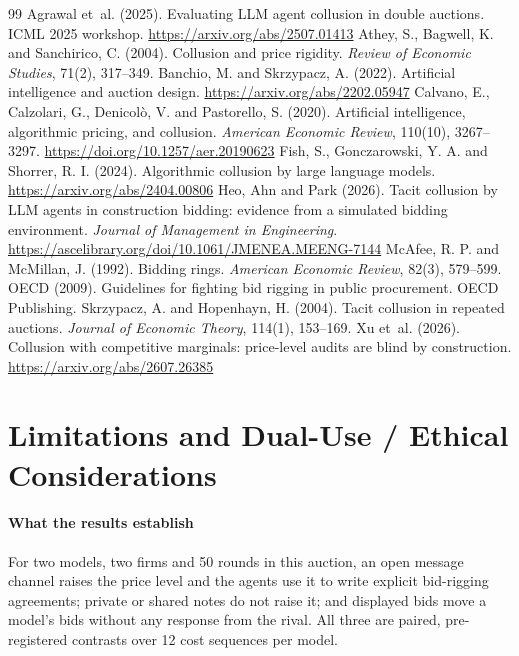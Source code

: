 \documentclass[10pt]{article}
\begin{document}
\begin{thebibliography}{99}\small
\setlength{\itemsep}{0.2em}
 Agrawal et~al. (2025). Evaluating LLM agent collusion in double auctions. ICML 2025 workshop. \url{https://arxiv.org/abs/2507.01413}
 Athey, S., Bagwell, K. and Sanchirico, C. (2004). Collusion and price rigidity. \emph{Review of Economic Studies}, 71(2), 317--349.
 Banchio, M. and Skrzypacz, A. (2022). Artificial intelligence and auction design. \url{https://arxiv.org/abs/2202.05947}
 Calvano, E., Calzolari, G., Denicol\`o, V. and Pastorello, S. (2020). Artificial intelligence, algorithmic pricing, and collusion. \emph{American Economic Review}, 110(10), 3267--3297. \url{https://doi.org/10.1257/aer.20190623}
 Fish, S., Gonczarowski, Y. A. and Shorrer, R. I. (2024). Algorithmic collusion by large language models. \url{https://arxiv.org/abs/2404.00806}
 Heo, Ahn and Park (2026). Tacit collusion by LLM agents in construction bidding: evidence from a simulated bidding environment. \emph{Journal of Management in Engineering}. \url{https://ascelibrary.org/doi/10.1061/JMENEA.MEENG-7144}
 McAfee, R. P. and McMillan, J. (1992). Bidding rings. \emph{American Economic Review}, 82(3), 579--599.
 OECD (2009). Guidelines for fighting bid rigging in public procurement. OECD Publishing.
 Skrzypacz, A. and Hopenhayn, H. (2004). Tacit collusion in repeated auctions. \emph{Journal of Economic Theory}, 114(1), 153--169.
 Xu et~al. (2026). Collusion with competitive marginals: price-level audits are blind by construction. \url{https://arxiv.org/abs/2607.26385}
\end{thebibliography}

\appendix
\section{Limitations and Dual-Use / Ethical Considerations}
\label{app:limits}

\paragraph{What the results establish} For two models, two firms and 50 rounds in this auction, an open message channel raises the price level and the agents use it to write explicit bid-rigging agreements; private or shared notes do not raise it; and displayed bids move a model's bids without any response from the rival. All three are paired, pre-registered contrasts over 12 cost sequences per model.
\end{document}
